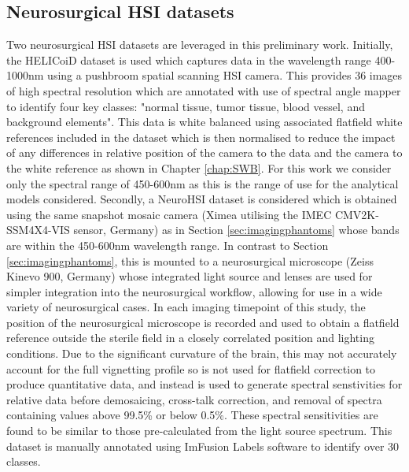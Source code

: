 \subsection{Neurosurgical HSI datasets}\label{sec:NeuroHSIdata}
Two neurosurgical HSI datasets are leveraged in this preliminary work. Initially, the HELICoiD dataset is used which captures data in the wavelength range 400-1000nm using a pushbroom spatial scanning HSI camera\cite{Fabelo2019}. This provides 36 images of high spectral resolution which are annotated with use of spectral angle mapper to identify four key classes: "normal tissue, tumor tissue, blood vessel, and background elements". This data is white balanced using associated flatfield white references included in the dataset which is then normalised to reduce the impact of any differences in relative position of the camera to the data and the camera to the white reference as shown in Chapter \ref{chap:SWB}. For this work we consider only the spectral range of 450-600nm as this is the range of use for the analytical models considered. Secondly, a NeuroHSI dataset is considered which is obtained using the same snapshot mosaic camera (Ximea utilising the IMEC CMV2K-SSM4X4-VIS sensor, Germany) as in Section \ref{sec:imagingphantoms} whose bands are within the 450-600nm wavelength range. In contrast to Section \ref{sec:imagingphantoms}, this is mounted to a neurosurgical microscope (Zeiss Kinevo 900, Germany) whose integrated light source and lenses are used for simpler integration into the neurosurgical workflow, allowing for use in a wide variety of neurosurgical cases. 
In each imaging timepoint of this study, the position of the neurosurgical microscope is recorded and used to obtain a flatfield reference outside the sterile field in a closely correlated position and lighting conditions. Due to the significant curvature of the brain, this may not accurately account for the full vignetting profile so is not used for flatfield correction to produce quantitative data, and instead is used to generate spectral senstivities for relative data before demosaicing, cross-talk correction, and removal of spectra containing values above 99.5\% or below 0.5\%. These spectral sensitivities are found to be similar to those pre-calculated from the light source spectrum. This dataset is manually annotated using ImFusion Labels software to identify over 30 classes. 

